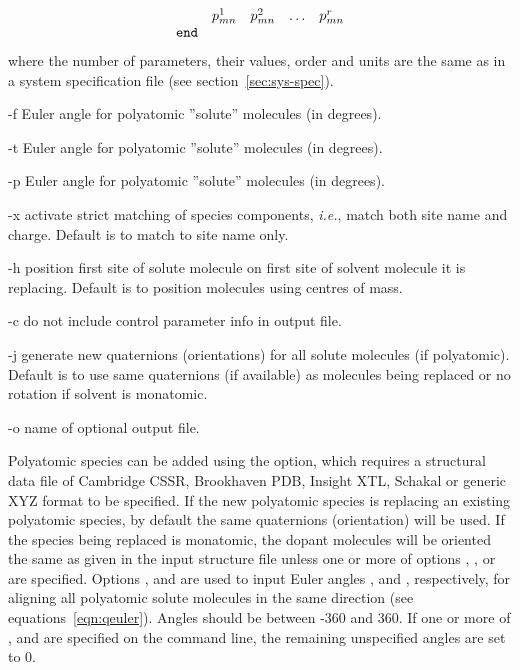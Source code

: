 \documentclass[a4paper,twoside]{report}
\newcommand{\ie}{\emph{i.e.}}
\begin{document}
\begin{Argdescription}
\begin{displaymath}
\begin{array}{llllllll}
 & p^{1}_{mn} & p^{2}_{mn} & \ldots & p^{r}_{mn}  \\
\texttt{end} \\
\end{array}
\end{displaymath}
where the number of parameters, their values, order and units are the
same as in a system specification file (see section~\ref{sec:sys-spec}).
\item[-f] Euler angle \phi for polyatomic ''solute'' molecules (in degrees).
\item[-t] Euler angle \theta for polyatomic ''solute'' molecules (in degrees).
\item[-p] Euler angle \psi for polyatomic ''solute'' molecules (in degrees).
\item[-x] activate strict matching of species components, \ie, match both site name and charge.
  Default is to match to site name only.
\item[-h] position first site of solute molecule on first site of solvent molecule it is replacing.
  Default is to position molecules using centres of mass.
\item[-c] do not include control parameter info in output file.
\item[-j] generate new quaternions (orientations) for all solute molecules (if polyatomic). Default is to use same quaternions (if available) as molecules being replaced or no rotation if solvent is monatomic.
\item[-o] name of optional output file.
\end{Argdescription}

Polyatomic species can be added using the  option, which requires a structural data file
of Cambridge CSSR, Brookhaven PDB, Insight XTL, Schakal or generic XYZ format to be specified. If the new polyatomic
species is replacing an existing polyatomic species, by default the same quaternions (orientation) will be used.
 If the species being replaced is monatomic, the dopant molecules will be oriented the same as given in the input structure file unless one or more of
 options , ,  or  are specified. Options ,  and  are used to input Euler angles \phi, \theta and \psi, respectively, for aligning all polyatomic solute molecules in the same direction (see equations~\ref{eqn:qeuler}).
 Angles should be between -360 and 360{\textdegree}.
If one or more of ,  and  are specified on the command
line, the remaining unspecified angles are set to 0.
\end{document}
